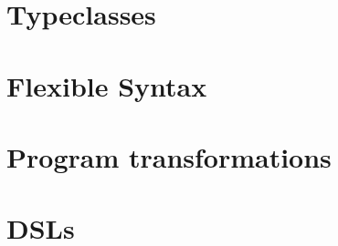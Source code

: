 \section{Typeclasses}

\section{Flexible Syntax}

\section{Program transformations}

\section{DSLs}
